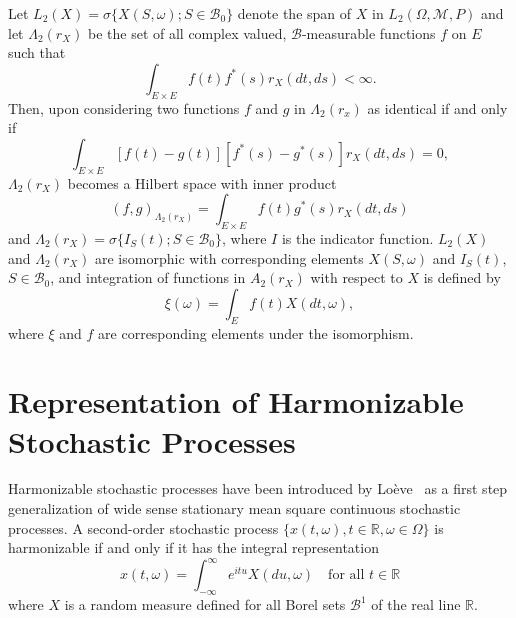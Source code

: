\documentclass{article}
\begin{document}
Let $L_2 (X) = \sigma \{X (S, \omega) ; S \in \mathscr{B}_0 \}$ denote the
span of $X$ in $L_2 (\Omega, \mathscr{M}, P)$ and let $\Lambda_2 (r_X)$ be the
set of all complex valued, $\mathscr{B}$-measurable functions $f$ on $E$ such
that
\begin{equation}
  \int_{E \times E} f (t) f^{\ast} (s) r_X (dt, ds) < \infty .
  \label{eq:lambda2}
\end{equation}
Then, upon considering two functions $f$ and $g$ in $\Lambda_2 (r_x)$ as
identical if and only if
\begin{equation}
  \int_{E \times E} [f (t) - g (t)]  [f^{\ast} (s) - g^{\ast} (s)] r_X (dt,
  ds) = 0, \label{eq:lambda2-ident}
\end{equation}
$\Lambda_2 (r_X)$ becomes a Hilbert space with inner product
\begin{equation}
  (f, g)_{\Lambda_2 (r_X)} = \int_{E \times E} f (t) g^{\ast} (s) r_X (dt, ds)
  \label{eq:lambda2-inner}
\end{equation}
and $\Lambda_2 (r_X) = \sigma \{I_S (t) ; S \in \mathscr{B}_0 \}$, where $I$
is the indicator function. $L_2 (X)$ and $\Lambda_2 (r_X)$ are isomorphic with
corresponding elements $X (S, \omega)$ and $I_S (t)$, $S \in \mathscr{B}_0$,
and integration of functions in $A_2 (r_X)$ with respect to $X$ is defined by
\begin{equation}
  \xi (\omega) = \int_E f (t) X (dt, \omega), \label{eq:xi}
\end{equation}
where $\xi$ and $f$ are corresponding elements under the isomorphism.

\section{Representation of Harmonizable Stochastic
Processes}\label{sec:representation}

Harmonizable stochastic processes have been introduced by
Lo{\`e}ve~{\cite{loeve1963}} as a first step generalization of wide sense
stationary mean square continuous stochastic processes. A second-order
stochastic process $\{x (t, \omega), t \in \mathbb{R}, \omega \in \Omega\}$ is
harmonizable if and only if it has the integral representation
\begin{equation}
  x (t, \omega) = \int_{- \infty}^{\infty} e^{itu} X (du, \omega)  \quad
  \text{for all } t \in \mathbb{R} \label{eq:proc-integral}
\end{equation}
where $X$ is a random measure defined for all Borel sets $\mathscr{B}^1$ of
the real line $\mathbb{R}$.
\end{document}
